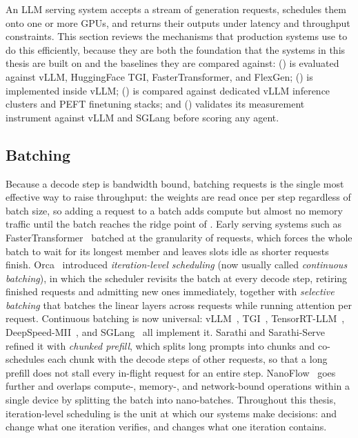 An LLM serving system accepts a stream of generation requests, schedules them onto one or more GPUs, and returns their outputs under latency and throughput constraints.
This section reviews the mechanisms that production systems use to do this efficiently, because they are both the foundation that the systems in this thesis are built on and the baselines they are compared against: \SpecInfer () is evaluated against vLLM, HuggingFace TGI, FasterTransformer, and FlexGen; \SuffixDecoding () is implemented inside vLLM; \FlexLLM () is compared against dedicated vLLM inference clusters and PEFT finetuning stacks; and \FastKernels () validates its measurement instrument against vLLM and SGLang before scoring any agent.

\subsection{Batching}
\label{background:subsec:batching}

Because a decode step is bandwidth bound, batching requests is the single most effective way to raise throughput: the weights are read once per step regardless of batch size, so adding a request to a batch adds compute but almost no memory traffic until the batch reaches the ridge point of .
Early serving systems such as FasterTransformer~\cite{fastertransformer} batched at the granularity of requests, which forces the whole batch to wait for its longest member and leaves slots idle as shorter requests finish.
Orca~\cite{yu2022orca} introduced \emph{iteration-level scheduling} (now usually called \emph{continuous batching}), in which the scheduler revisits the batch at every decode step, retiring finished requests and admitting new ones immediately, together with \emph{selective batching} that batches the linear layers across requests while running attention per request.
Continuous batching is now universal: vLLM~\cite{vllm}, TGI~\cite{huggingface_tgi}, TensorRT-LLM~\cite{tensorrt-llm}, DeepSpeed-MII~\cite{deepspeed-mii}, and SGLang~\cite{sglang} all implement it.
Sarathi and Sarathi-Serve~\cite{agrawal2023sarathi,agrawal2024taming} refined it with \emph{chunked prefill}, which splits long prompts into chunks and co-schedules each chunk with the decode steps of other requests, so that a long prefill does not stall every in-flight request for an entire step.
NanoFlow~\cite{nanoflow} goes further and overlaps compute-, memory-, and network-bound operations within a single device by splitting the batch into nano-batches.
Throughout this thesis, iteration-level scheduling is the unit at which our systems make decisions: \SpecInfer and \SuffixDecoding change what one iteration verifies, and \FlexLLM changes what one iteration contains.

